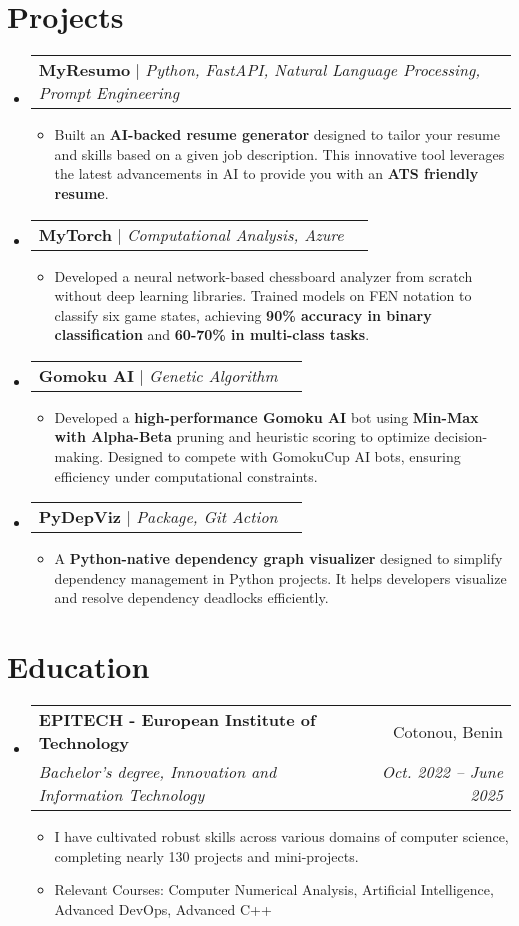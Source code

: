 \documentclass[letterpaper,11pt]{article}
\makeatletter
\newcommand{\resumeItem}[1]{
  \item\small{
    {#1 \vspace{-2pt}}
  }
}
\newcommand{\resumeSubheading}[4]{
  \vspace{-2pt}\item
    \begin{tabular*}{0.97\textwidth}[t]{l@{\extracolsep{\fill}}r}
      \textbf{#1} & #2 \\
      \textit{\small#3} & \textit{\small #4} \\
    \end{tabular*}\vspace{-7pt}
}
\newcommand{\resumeProjectHeading}[2]{
    \item
    \begin{tabular*}{0.97\textwidth}{l@{\extracolsep{\fill}}r}
      \small#1 & #2 \\
    \end{tabular*}\vspace{-7pt}
}
\newcommand{\resumeSubHeadingListStart}{\begin{itemize}[leftmargin=0.15in, label={}]}
\newcommand{\resumeSubHeadingListEnd}{\end{itemize}}
\newcommand{\resumeItemListStart}{\begin{itemize}}
\newcommand{\resumeItemListEnd}{\end{itemize}\vspace{-5pt}}
\makeatother
\begin{document}
\section{Projects}
    \resumeSubHeadingListStart
      \resumeProjectHeading
          {\textbf{MyResumo} $|$ \emph{Python, FastAPI, Natural Language Processing, Prompt Engineering}}{} 
          \resumeItemListStart
            \resumeItem{Built an \textbf{AI-backed resume generator} designed to tailor your resume and skills based on a given job description. This innovative tool leverages the latest advancements in AI to provide you with an \textbf{ATS friendly resume}.}
          \resumeItemListEnd
      \resumeProjectHeading
          {\textbf{MyTorch} $|$ \emph{Computational Analysis, Azure}}{}
          \resumeItemListStart
            \resumeItem{Developed a neural network-based chessboard analyzer from scratch without deep learning libraries. Trained models on FEN notation to classify six game states, achieving \textbf{90\% accuracy in binary classification} and \textbf{60-70\% in multi-class tasks}.}
          \resumeItemListEnd
      \resumeProjectHeading
          {\textbf{Gomoku AI} $|$ \emph{Genetic Algorithm}}{}
          \resumeItemListStart
            \resumeItem{Developed a \textbf{high-performance Gomoku AI} bot using \textbf{Min-Max with Alpha-Beta} pruning and heuristic scoring to optimize decision-making. Designed to compete with GomokuCup AI bots, ensuring efficiency under computational constraints.}
          \resumeItemListEnd
      \resumeProjectHeading
          {\textbf{PyDepViz} $|$ \emph{Package, Git Action}}{}
          \resumeItemListStart
            \resumeItem{A \textbf{Python-native dependency graph visualizer} designed to simplify dependency management in Python projects. It helps developers visualize and resolve dependency deadlocks efficiently.}
          \resumeItemListEnd
    \resumeSubHeadingListEnd

\section{Education}
  \resumeSubHeadingListStart
    \resumeSubheading
      {EPITECH - European Institute of Technology}{Cotonou, Benin}
      {Bachelor's degree, Innovation and Information Technology}{Oct. 2022 -- June 2025}
      \resumeItemListStart
        \resumeItem{I have cultivated robust skills across various domains of computer science, completing nearly 130 projects and mini-projects.}
        \resumeItem{Relevant Courses: Computer Numerical Analysis, Artificial Intelligence, Advanced DevOps, Advanced C++}
      \resumeItemListEnd
  \resumeSubHeadingListEnd
\end{document}
